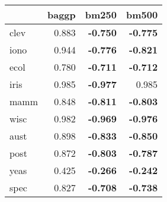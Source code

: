 \begin{tabular}{lrrr}
\toprule
{} &  baggp &  bm250 &  bm500 \\
\midrule
clev & 0.883 &    \textbf{-0.750} &    \textbf{-0.775} \\
iono & 0.944 &    \textbf{-0.776} &    \textbf{-0.821} \\
ecol & 0.780 &    \textbf{-0.711} &    \textbf{-0.712} \\
iris & 0.985 &    \textbf{-0.977} & 0.985 \\
mamm & 0.848 &    \textbf{-0.811} &    \textbf{-0.803} \\
wisc & 0.982 &    \textbf{-0.969} &    \textbf{-0.976} \\
aust & 0.898 &    \textbf{-0.833} &    \textbf{-0.850} \\
post & 0.872 &    \textbf{-0.803} &    \textbf{-0.787} \\
yeas & 0.425 &    \textbf{-0.266} &    \textbf{-0.242} \\
spec & 0.827 &    \textbf{-0.708} &    \textbf{-0.738} \\
\bottomrule
\end{tabular}
